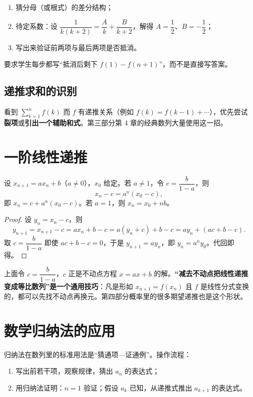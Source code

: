 \begin{teach}[裂项的三个步骤]
\begin{enumerate}
\item 猜分母（或根式）的差分结构；
\item 待定系数：设 $\dfrac{1}{k(k+2)}=\dfrac{A}{k}+\dfrac{B}{k+2}$，解得 $A=\dfrac12$、$B=-\dfrac12$；
\item 写出来验证前两项与最后两项是否抵消。
\end{enumerate}
要求学生每步都写“抵消后剩下 $f(1)-f(n+1)$”，而不是直接写答案。
\end{teach}

\subsection{递推求和的识别}
看到 $\sum_{k=1}^n f(k)$ 而 $f$ 有递推关系（例如 $f(k)=f(k-1)+\cdots$），优先尝试\textbf{裂项}或\textbf{引出一个辅助和式}。第三部分第 4 章的经典数列大量使用这一招。

\section{一阶线性递推}
\begin{theorem}[一阶线性递推的通项]
设 $x_{n+1}=ax_n+b$（$a\ne0$），$x_0$ 给定。若 $a\ne1$，令 $c=\dfrac{b}{1-a}$，则
\[
x_n-c=a^n(x_0-c),
\]
即 $x_n=c+a^n(x_0-c)$。若 $a=1$，则 $x_n=x_0+nb$。
\end{theorem}
\begin{proof}
设 $y_n=x_n-c$，则
\[
y_{n+1}=x_{n+1}-c=ax_n+b-c=a(y_n+c)+b-c=ay_n+(ac+b-c).
\]
取 $c=\dfrac{b}{1-a}$ 即使 $ac+b-c=0$，于是 $y_{n+1}=ay_n$，即 $y_n=a^ny_0$。代回即得。
\end{proof}

\begin{tip}[不动点换元的通用性]
上面令 $c=\dfrac{b}{1-a}$，$c$ 正是不动点方程 $x=ax+b$ 的解。\textbf{“减去不动点把线性递推变成等比数列”是一个通用技巧}：凡是形如 $x_{n+1}=f(x_n)$ 且 $f$ 是线性分式变换的，都可以先找不动点再换元。第四部分概率里的很多期望递推也是这个形状。
\end{tip}

\section{数学归纳法的应用}
归纳法在数列里的标准用法是“猜通项—证通例”。操作流程：
\begin{enumerate}
\item 写出前若干项，观察规律，猜出 $a_n$ 的表达式；
\item 用归纳法证明：$n=1$ 验证；假设 $a_k$ 已知，从递推式推出 $a_{k+1}$ 的表达式。
\end{enumerate}

